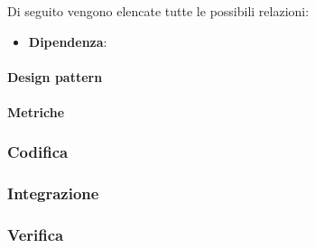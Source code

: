      Di seguito vengono elencate tutte le possibili relazioni:
     \begin{itemize}
        \item \textbf{Dipendenza}:
     \end{itemize}
    
    \paragraph{Design pattern}
    
    \paragraph{Metriche}
\subsubsection{Codifica}

\subsubsection{Integrazione}

\subsubsection{Verifica}


